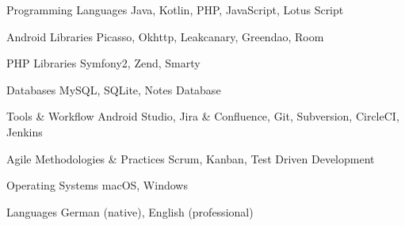 

\begin{cvskills}

  \cvskill
    {Programming Languages} %
    {Java, Kotlin, PHP, JavaScript, Lotus Script} %
  
  \cvskill
    {Android Libraries} %
    {Picasso, Okhttp, Leakcanary, Greendao, Room} %
  
  \cvskill
    {PHP Libraries} %
    {Symfony2, Zend, Smarty} %
  
  \cvskill
    {Databases} %
    {MySQL, SQLite, Notes Database} %

  \cvskill
    {Tools \& Workflow} %
    {Android Studio, Jira \& Confluence, Git, Subversion, CircleCI, Jenkins} %

  \cvskill
    {Agile Methodologies \& Practices} %
    {Scrum, Kanban, Test Driven Development} %

  \cvskill
    {Operating Systems} %
    {macOS, Windows} %

  \cvskill
    {Languages} %
    {German (native), English (professional)} %

\end{cvskills}

